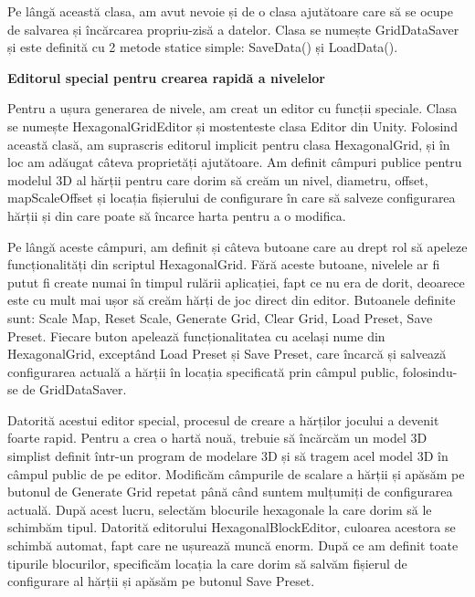 \documentclass[12pt, a4paper]{article}
\begin{document}
	Pe lângă această clasa, am avut nevoie și de o clasa ajutătoare care să se ocupe de salvarea și încărcarea propriu-zisă a datelor. Clasa se numește GridDataSaver și este definită cu 2 metode statice simple: SaveData() și LoadData().
	\newline
	
	
	
	
	
	\textbf{Editorul special pentru crearea rapidă a nivelelor}
	
	Pentru a ușura generarea de nivele, am creat un editor cu funcții speciale. Clasa se numește HexagonalGridEditor și mostenteste clasa Editor din Unity. Folosind această clasă, am suprascris editorul implicit pentru clasa HexagonalGrid, și în loc am adăugat câteva proprietăți ajutătoare. Am definit câmpuri publice pentru modelul 3D al hărții pentru care dorim să creăm un nivel, diametru, offset, mapScaleOffset și locația fișierului de configurare în care să salveze configurarea hărții și din care poate să încarce harta pentru a o modifica.
	\newline
	
	Pe lângă aceste câmpuri, am definit și câteva butoane care au drept rol să apeleze funcționalități din scriptul HexagonalGrid. Fără aceste butoane, nivelele ar fi putut fi create numai în timpul rulării aplicației, fapt ce nu era de dorit, deoarece este cu mult mai ușor să creăm hărți de joc direct din editor. Butoanele definite sunt: Scale Map, Reset Scale, Generate Grid, Clear Grid, Load Preset, Save Preset. Fiecare buton apelează funcționalitatea cu același nume din HexagonalGrid, exceptând Load Preset și Save Preset, care încarcă și salvează configurarea actuală a hărții în locația specificată prin câmpul public, folosindu-se de GridDataSaver.
	\newline
	
	Datorită acestui editor special, procesul de creare a hărților jocului a devenit foarte rapid. Pentru a crea o hartă nouă, trebuie să încărcăm un model 3D simplist definit într-un program de modelare 3D și să tragem acel model 3D în câmpul public de pe editor. Modificăm câmpurile de scalare a hărții și apăsăm pe butonul de Generate Grid repetat până când suntem mulțumiți de configurarea actuală. După acest lucru, selectăm blocurile hexagonale la care dorim să le schimbăm tipul. Datorită editorului HexagonalBlockEditor, culoarea acestora se schimbă automat, fapt care ne ușurează muncă enorm. După ce am definit toate tipurile blocurilor, specificăm locația la care dorim să salvăm fișierul de configurare al hărții și apăsăm pe butonul Save Preset.
	\newline
	
\end{document}
